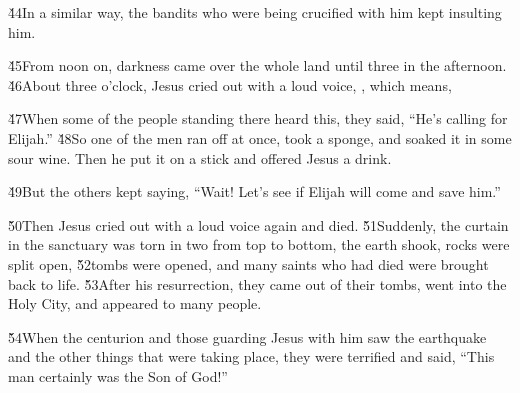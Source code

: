 \v{44}In a similar way, the bandits who were being crucified with him kept insulting him.

\v{45}From noon on, darkness came over the whole land until three in the afternoon. \v{46}About three o'clock, Jesus cried out with a loud voice, , which means, 

\v{47}When some of the people standing there heard this, they said, ``He's calling for Elijah.'' \v{48}So one of the men ran off at once, took a sponge, and soaked it in some sour wine. Then he put it on a stick and offered Jesus a drink.

\v{49}But the others kept saying, ``Wait! Let's see if Elijah will come and save him.''

\v{50}Then Jesus cried out with a loud voice again and died. \v{51}Suddenly, the curtain in the sanctuary was torn in two from top to bottom, the earth shook, rocks were split open, \v{52}tombs were opened, and many saints who had died were brought back to life. \v{53}After his resurrection, they came out of their tombs, went into the Holy City, and appeared to many people.

\v{54}When the centurion and those guarding Jesus with him saw the earthquake and the other things that were taking place, they were terrified and said, ``This man certainly was the Son of God!''

